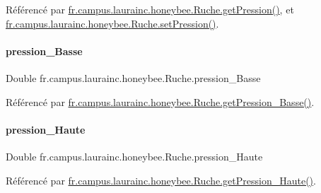 Référencé par \hyperlink{classfr_1_1campus_1_1laurainc_1_1honeybee_1_1_ruche_a9d94748ece29463c420e93e0e7aa7acd}{fr.\+campus.\+laurainc.\+honeybee.\+Ruche.\+get\+Pression()}, et \hyperlink{classfr_1_1campus_1_1laurainc_1_1honeybee_1_1_ruche_a149083353b1430ef67fef5de226f8947}{fr.\+campus.\+laurainc.\+honeybee.\+Ruche.\+set\+Pression()}.

\mbox{\label{classfr_1_1campus_1_1laurainc_1_1honeybee_1_1_ruche_a195271425f165de0607902f1c76a235a}} 
\paragraph{\texorpdfstring{pression\+\_\+\+Basse}{pression\_Basse}}
{\footnotesize\ttfamily Double fr.\+campus.\+laurainc.\+honeybee.\+Ruche.\+pression\+\_\+\+Basse\hspace{0.3cm}{\ttfamily [private]}}



Référencé par \hyperlink{classfr_1_1campus_1_1laurainc_1_1honeybee_1_1_ruche_a385eb9af510d10a97bfb2ee2ddd546b7}{fr.\+campus.\+laurainc.\+honeybee.\+Ruche.\+get\+Pression\+\_\+\+Basse()}.

\mbox{\label{classfr_1_1campus_1_1laurainc_1_1honeybee_1_1_ruche_a5218589d82413783a85b71a8f765e565}} 
\paragraph{\texorpdfstring{pression\+\_\+\+Haute}{pression\_Haute}}
{\footnotesize\ttfamily Double fr.\+campus.\+laurainc.\+honeybee.\+Ruche.\+pression\+\_\+\+Haute\hspace{0.3cm}{\ttfamily [private]}}



Référencé par \hyperlink{classfr_1_1campus_1_1laurainc_1_1honeybee_1_1_ruche_ae1602ae8e80e6c51a166251b981f99e0}{fr.\+campus.\+laurainc.\+honeybee.\+Ruche.\+get\+Pression\+\_\+\+Haute()}.

